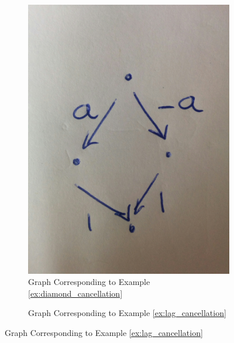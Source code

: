 \documentclass[12pt]{article}
\begin{document}
\begin{figure}
  \centering
  \begin{subfigure}[b]{0.45\textwidth}
    \caption{Graph Corresponding to Example \ref{ex:diamond_cancellation}}
    \label{fig:diamond_cancellation}
    \includegraphics[width=\linewidth]{hand_drawn_example1.jpg}
  \end{subfigure}
  \begin{subfigure}[b]{0.45\textwidth}
    \caption{Graph Corresponding to Example \ref{ex:lag_cancellation}}
    \label{fig:lag_cancellation}

\end{subfigure}
\end{figure}
\end{document}
